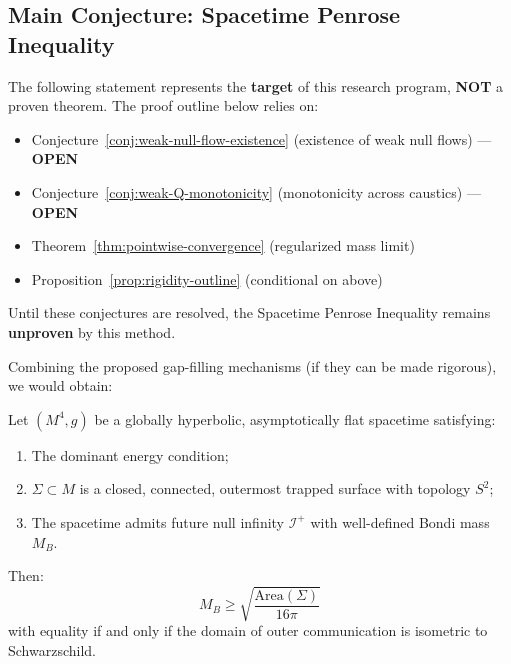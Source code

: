 \subsection{Main Conjecture: Spacetime Penrose Inequality}

\begin{remark}
The following statement represents the \textbf{target} of this research program, \textbf{NOT} a proven theorem. The proof outline below relies on:
\begin{itemize}
\item Conjecture~\ref{conj:weak-null-flow-existence} (existence of weak null flows) --- \textbf{OPEN}
\item Conjecture~\ref{conj:weak-Q-monotonicity} (monotonicity across caustics) --- \textbf{OPEN}
\item Theorem~\ref{thm:pointwise-convergence} (regularized mass limit)
\item Proposition~\ref{prop:rigidity-outline} (conditional on above)
\end{itemize}
Until these conjectures are resolved, the Spacetime Penrose Inequality remains \textbf{unproven} by this method.
\end{remark}

Combining the proposed gap-filling mechanisms (if they can be made rigorous), we would obtain:

\begin{conjecture}
\label{conj:spacetime-penrose-main}
Let $(M^4, g)$ be a globally hyperbolic, asymptotically flat spacetime satisfying:
\begin{enumerate}[label=\textbf{(H\arabic*)}]
\item The dominant energy condition;
\item $\Sigma \subset M$ is a closed, connected, outermost trapped surface with topology $S^2$;
\item The spacetime admits future null infinity $\mathscr{I}^+$ with well-defined Bondi mass $M_B$.
\end{enumerate}
Then:
\begin{equation}
\boxed{M_B \geq \sqrt{\frac{\mathrm{Area}(\Sigma)}{16\pi}}}
\end{equation}
with equality if and only if the domain of outer communication is isometric to Schwarzschild.
\end{conjecture}

